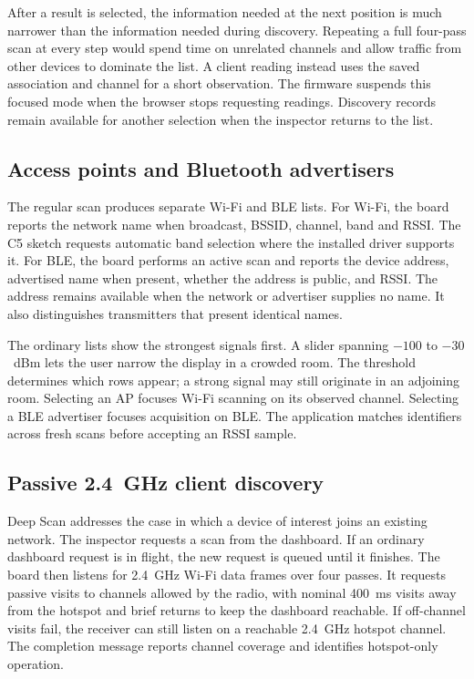 \documentclass[conference]{IEEEtran}
\begin{document}
After a result is selected, the information needed at the next position is much narrower than the information needed during discovery. Repeating a full four-pass scan at every step would spend time on unrelated channels and allow traffic from other devices to dominate the list. A client reading instead uses the saved association and channel for a short observation. The firmware suspends this focused mode when the browser stops requesting readings. Discovery records remain available for another selection when the inspector returns to the list.

\subsection{Access points and Bluetooth advertisers}
The regular scan produces separate Wi-Fi and BLE lists. For Wi-Fi, the board reports the network name when broadcast, BSSID, channel, band and RSSI. The C5 sketch requests automatic band selection where the installed driver supports it. For BLE, the board performs an active scan and reports the device address, advertised name when present, whether the address is public, and RSSI. The address remains available when the network or advertiser supplies no name. It also distinguishes transmitters that present identical names.

The ordinary lists show the strongest signals first. A slider spanning $-100$ to $-30$~dBm lets the user narrow the display in a crowded room. The threshold determines which rows appear; a strong signal may still originate in an adjoining room. Selecting an AP focuses Wi-Fi scanning on its observed channel. Selecting a BLE advertiser focuses acquisition on BLE. The application matches identifiers across fresh scans before accepting an RSSI sample.

\subsection{Passive 2.4~GHz client discovery}
Deep Scan addresses the case in which a device of interest joins an existing network. The inspector requests a scan from the dashboard. If an ordinary dashboard request is in flight, the new request is queued until it finishes. The board then listens for 2.4~GHz Wi-Fi data frames over four passes. It requests passive visits to channels allowed by the radio, with nominal 400~ms visits away from the hotspot and brief returns to keep the dashboard reachable. If off-channel visits fail, the receiver can still listen on a reachable 2.4~GHz hotspot channel. The completion message reports channel coverage and identifies hotspot-only operation.
\end{document}
